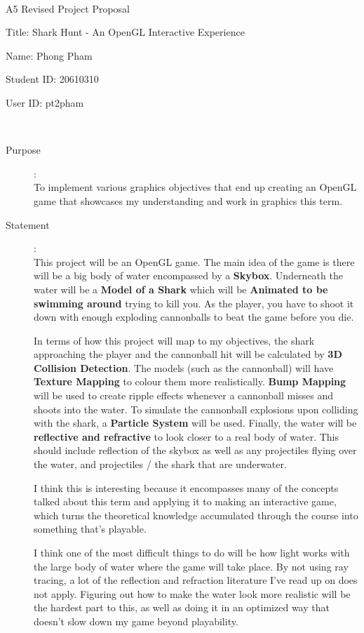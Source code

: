 \documentclass {article}
\begin{document}
~\vfill
\begin{center}
\Large

A5 Revised Project Proposal

Title: Shark Hunt - An OpenGL Interactive Experience

Name: Phong Pham

Student ID: 20610310

User ID: pt2pham
\end{center}
\vfill ~\vfill~
\newpage
{}
\begin{description}
\item[Purpose]:\\
     To implement various graphics objectives that end up creating an OpenGL game that
     showcases my understanding and work in graphics this term.

\item[Statement]:\\
     This project will be an OpenGL game. The main idea of the game is 
     there will be a big body of water encompassed by a \textbf{Skybox}. Underneath 
     the water will be a \textbf{Model of a Shark} which will be \textbf{Animated to be
     swimming around} trying to kill you. As the player, you have to shoot it 
     down with enough exploding cannonballs to beat the game before you die. 
     
     In terms of how this project will map to my objectives, the shark
     approaching the player and the cannonball hit will be 
     calculated by \textbf{3D Collision Detection}. The models (such as the cannonball) will have 
     \textbf{Texture Mapping} to colour them more realistically. \textbf{Bump Mapping} 
     will be used to create ripple effects whenever a cannonball misses 
     and shoots into the water. To simulate the cannonball explosions
     upon colliding with the shark, a \textbf{Particle System} will be used. Finally, 
     the water will be \textbf{reflective and refractive} to look closer to a real body of 
     water. This should include reflection of the skybox as well as any projectiles flying over the water, 
     and projectiles / the shark that are underwater. 

     I think this is interesting because it encompasses many of the concepts talked 
     about this term and applying it to making an interactive game, which turns 
     the theoretical knowledge accumulated through the course into something that's 
     playable.
     
     I think one of the most difficult things to do will be how light works with the large body 
     of water where the game will take place. By not using ray tracing, a lot of the 
     reflection and refraction literature I've read up on does not apply. Figuring out 
     how to make the water look more realistic will be the hardest part to this, as well as 
     doing it in an optimized way that doesn't slow down my game beyond playability.


\end{description}
\end{document}
